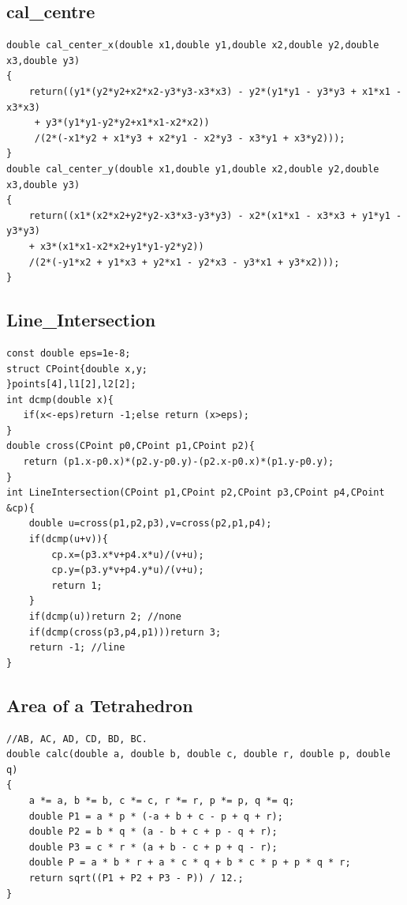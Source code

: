 \documentclass[twocolumn]{article}
\begin{document}
\begin{twocolumn}
\subsection{cal\_centre}
\begin{lstlisting}[language={[ANSI]C}]
double cal_center_x(double x1,double y1,double x2,double y2,double x3,double y3)
{
    return((y1*(y2*y2+x2*x2-y3*y3-x3*x3) - y2*(y1*y1 - y3*y3 + x1*x1 - x3*x3)
     + y3*(y1*y1-y2*y2+x1*x1-x2*x2))
     /(2*(-x1*y2 + x1*y3 + x2*y1 - x2*y3 - x3*y1 + x3*y2)));
}
double cal_center_y(double x1,double y1,double x2,double y2,double x3,double y3)
{
    return((x1*(x2*x2+y2*y2-x3*x3-y3*y3) - x2*(x1*x1 - x3*x3 + y1*y1 - y3*y3)
    + x3*(x1*x1-x2*x2+y1*y1-y2*y2))
    /(2*(-y1*x2 + y1*x3 + y2*x1 - y2*x3 - y3*x1 + y3*x2)));
}
\end{lstlisting}

\subsection{Line\_Intersection}
\begin{lstlisting}[language={[ANSI]C}]
const double eps=1e-8;
struct CPoint{double x,y;
}points[4],l1[2],l2[2];
int dcmp(double x){
   if(x<-eps)return -1;else return (x>eps);
}
double cross(CPoint p0,CPoint p1,CPoint p2){
   return (p1.x-p0.x)*(p2.y-p0.y)-(p2.x-p0.x)*(p1.y-p0.y);
}
int LineIntersection(CPoint p1,CPoint p2,CPoint p3,CPoint p4,CPoint &cp){
    double u=cross(p1,p2,p3),v=cross(p2,p1,p4);
    if(dcmp(u+v)){
        cp.x=(p3.x*v+p4.x*u)/(v+u);
        cp.y=(p3.y*v+p4.y*u)/(v+u);
        return 1;
    }
    if(dcmp(u))return 2; //none
    if(dcmp(cross(p3,p4,p1)))return 3;
    return -1; //line
}
\end{lstlisting}



\subsection{Area of a Tetrahedron}
\begin{lstlisting}[language={[ANSI]C}]
//AB, AC, AD, CD, BD, BC.
double calc(double a, double b, double c, double r, double p, double q)
{
    a *= a, b *= b, c *= c, r *= r, p *= p, q *= q;
    double P1 = a * p * (-a + b + c - p + q + r);
    double P2 = b * q * (a - b + c + p - q + r);
    double P3 = c * r * (a + b - c + p + q - r);
    double P = a * b * r + a * c * q + b * c * p + p * q * r;
    return sqrt((P1 + P2 + P3 - P)) / 12.;
}
\end{lstlisting}



\end{twocolumn}
\end{document}
